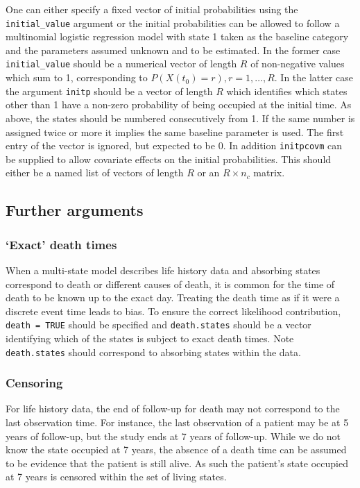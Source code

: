 \documentclass{article}
\numberwithin{equation}{section}
\begin{document}
One can either specify a fixed vector of initial probabilities using the \verb!initial_value! argument or the initial probabilities can be allowed to follow a multinomial logistic regression model with state 1 taken as the baseline category and the parameters assumed unknown and to be estimated. In the former case \verb!initial_value! should be a numerical vector of length $R$ of non-negative values which sum to 1, corresponding to $P(X(t_0)= r), r=1, \ldots, R$. In the latter case the argument \verb!initp! should be a vector of length $R$ which identifies which states other than 1 have a non-zero probability of being occupied at the initial time. As above, the states should be numbered consecutively from 1. If the same number is assigned twice or more it implies the same baseline parameter is used. The first entry of the vector is ignored, but expected to be 0. In addition \verb!initpcovm! can be supplied to allow covariate effects on the initial probabilities. This should either be a named list of vectors of length $R$ or an $R \times n_c$ matrix.

\subsection{Further arguments}

\subsubsection{`Exact' death times}

When a multi-state model describes life history data and absorbing states correspond to death or different causes of death, it is common for the time of death to be known up to the exact day. Treating the death time as if it were a discrete event time leads to bias. To ensure the correct likelihood contribution, \verb!death = TRUE! should be specified and \verb!death.states! should be a vector identifying which of the states is subject to exact death times. Note \verb!death.states! should correspond to absorbing states within the data.

\subsubsection{Censoring}

For life history data, the end of follow-up for death may not correspond to the last observation time. For instance, the last observation of a patient may be at 5 years of follow-up, but the study ends at 7 years of follow-up. While we do not know the state occupied at 7 years, the absence of a death time can be assumed to be evidence that the patient is still alive. As such the patient's state occupied at 7 years is censored within the set of living states. 
\end{document}
